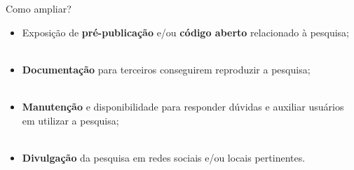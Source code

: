 \begin{frame}{Como ampliar?}
	\justify 
	\begin{itemize}
		\item<1> Exposição de \textbf{pré-publicação} e/ou \textbf{código aberto} relacionado à pesquisa;
		\\~\\
		\item<2> \textbf{Documentação} para terceiros conseguirem reproduzir a pesquisa;
		\\~\\
		\item<3> \textbf{Manutenção} e disponibilidade para responder dúvidas e auxiliar usuários em utilizar a pesquisa;
		\\~\\
		\item<4> \textbf{Divulgação} da pesquisa em redes sociais e/ou locais pertinentes.
	\end{itemize}
\end{frame}